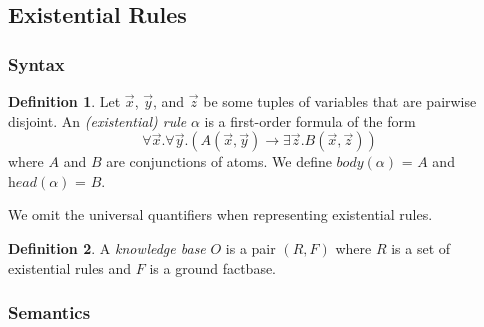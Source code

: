 \documentclass{article}
\theoremstyle{definition}
\newtheorem{definition}{Definition}[section]
\theoremstyle{remark}
\begin{document}



\subsection{Existential Rules}

\subsubsection{Syntax}

\begin{definition}
Let $\vec x$, $\vec y$, and $\vec z$ be some tuples of variables that are pairwise disjoint. An \emph{(existential) rule} $\alpha$ is a first-order formula	of the form $$\forall \vec x.\forall \vec y.( A(\vec x,\vec y) \rightarrow \exists \vec z. B(\vec x,\vec z))$$ where $A$ and $B$ are conjunctions of atoms. We define \emph{$\textit{body}(\alpha)$} = $A$ and \emph{$\textit{head}(\alpha)$} = $B$.
\end{definition}
We omit the universal quantifiers when representing existential rules.
\begin{definition}

A \emph{knowledge base} $O$ is a pair $(R,F)$ where $R$ is a set of existential rules and $F$ is a  ground factbase.
\end{definition}


\subsubsection{Semantics}
\end{document}
